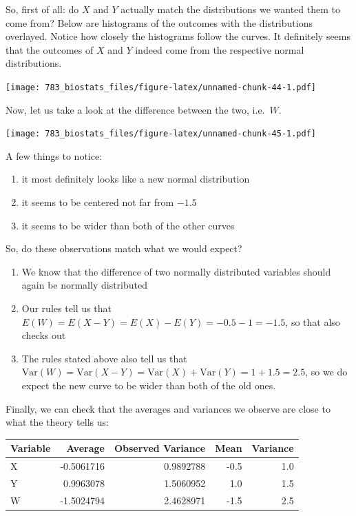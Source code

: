 \documentclass[]{book}
\providecommand{\tightlist}{%
  \setlength{\itemsep}{0pt}\setlength{\parskip}{0pt}}
\theoremstyle{definition}
\theoremstyle{definition}
\theoremstyle{definition}
\theoremstyle{remark}
\begin{document}
So, first of all: do \(X\) and \(Y\) actually match the distributions we wanted them to come from? Below are histograms of the outcomes with the distributions overlayed. Notice how closely the histograms follow the curves. It definitely seems that the outcomes of \(X\) and \(Y\) indeed come from the respective normal distributions.

\texttt{[image: 783\_biostats\_files/figure-latex/unnamed-chunk-44-1.pdf]}

Now, let us take a look at the difference between the two, i.e.~\(W\).

\texttt{[image: 783\_biostats\_files/figure-latex/unnamed-chunk-45-1.pdf]}

A few things to notice:

\begin{enumerate}
\def\labelenumi{\arabic{enumi}.}
\tightlist
\item
  it most definitely looks like a new normal distribution
\item
  it seems to be centered not far from \(-1.5\)
\item
  it seems to be wider than both of the other curves
\end{enumerate}

So, do these observations match what we would expect?

\begin{enumerate}
\def\labelenumi{\arabic{enumi}.}
\tightlist
\item
  We know that the difference of two normally distributed variables should again be normally distributed
\item
  Our rules tell us that \(E(W) = E(X - Y) = E(X) - E(Y) = -0.5 - 1 = -1.5\), so that also checks out
\item
  The rules stated above also tell us that \(\text{Var}(W) = \text{Var}(X - Y) = \text{Var}(X) + \text{Var}(Y) = 1 + 1.5 = 2.5\), so we do expect the new curve to be wider than both of the old ones.
\end{enumerate}

Finally, we can check that the averages and variances we observe are close to what the theory tells us:

\begin{tabular}{l|r|r|r|r}
\hline
Variable & Average & Observed Variance & Mean & Variance\\
\hline
X & -0.5061716 & 0.9892788 & -0.5 & 1.0\\
\hline
Y & 0.9963078 & 1.5060952 & 1.0 & 1.5\\
\hline
W & -1.5024794 & 2.4628971 & -1.5 & 2.5\\
\hline
\end{tabular}
\end{document}
